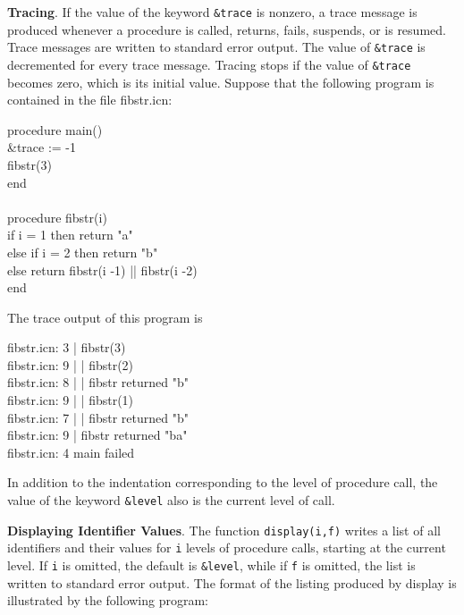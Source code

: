 \textbf{Tracing}. If the value of the keyword \texttt{\&trace} is
nonzero, a trace message is produced whenever a procedure is called,
returns, fails, suspends, or is resumed. Trace messages are written to
standard error output. The value of \texttt{\&trace} is decremented
for every trace message. Tracing stops if the value of
\texttt{\&trace} becomes zero, which is its initial value. Suppose
that the following program is contained in the file fibstr.icn:

\begin{iconcode}
\>procedure main()\\
\>\>\&trace := -1\\
\>\>fibstr(3)\\
\>end\\
\\
\>procedure fibstr(i)\\
\>\>if i = 1 then return "a"\\
\>\>else if i = 2 then return "b"\\
\>\>else return fibstr(i -1) || fibstr(i -2)\\
\>end
\end{iconcode}

The trace output of this program is

\begin{iconcode}
\>fibstr.icn: 3  \>\>\>\>\>\>  | fibstr(3)\\
\>fibstr.icn: 9  \>\>\>\>\>\>  | | fibstr(2)\\
\>fibstr.icn: 8  \>\>\>\>\>\>  | | fibstr returned "b"\\
\>fibstr.icn: 9  \>\>\>\>\>\>  | | fibstr(1)\\
\>fibstr.icn: 7  \>\>\>\>\>\>  | | fibstr returned "b"\\
\>fibstr.icn: 9  \>\>\>\>\>\>  | fibstr returned "ba"\\
\>fibstr.icn: 4  \>\>\>\>\>\>  main failed
\end{iconcode}

In addition to the indentation corresponding to the level of procedure
call, the value of the keyword \texttt{\&level} also is the current
level of call.

\textbf{Displaying Identifier Values}. The function
\texttt{display(i,f)} writes a list of all identifiers and their
values for \texttt{i} levels of procedure calls, starting at the
current level. If \texttt{i} is omitted, the default is
\texttt{\&level}, while if \texttt{f} is omitted, the list is written
to standard error output. The format of the listing produced by
display is illustrated by the following program:

